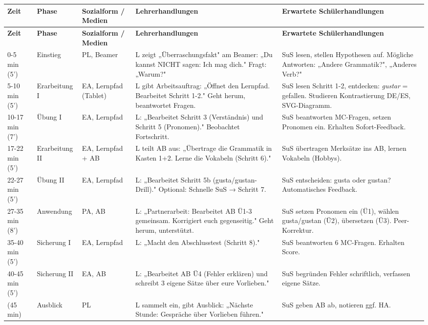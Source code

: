 \documentclass[11pt, a4paper]{article}
\newcommand{\es}[1]{\textcolor{spanisch}{\textit{#1}}}
\begin{document}
\small
\begin{longtable}{|p{1.2cm}|p{2cm}|p{2.5cm}|p{4.5cm}|p{4cm}|}
    \hline
    \textbf{Zeit} & \textbf{Phase} & \textbf{Sozialform / Medien} & \textbf{Lehrerhandlungen} & \textbf{Erwartete Schülerhandlungen} \\
    \hline
    \endfirsthead
    \hline
    \textbf{Zeit} & \textbf{Phase} & \textbf{Sozialform / Medien} & \textbf{Lehrerhandlungen} & \textbf{Erwartete Schülerhandlungen} \\
    \hline
    \endhead

    0-5 min (5') & Einstieg & PL, Beamer & L zeigt „Überraschungsfakt" am Beamer: „Du kannst NICHT sagen: Ich mag dich." Fragt: „Warum?" & SuS lesen, stellen Hypothesen auf. Mögliche Antworten: „Andere Grammatik?", „Anderes Verb?" \\
    \hline

    5-10 min (5') & Erarbeitung I & EA, Lernpfad (Tablet) & L gibt Arbeitsauftrag: „Öffnet den Lernpfad. Bearbeitet Schritt 1-2." Geht herum, beantwortet Fragen. & SuS lesen Schritt 1-2, entdecken: \es{gustar} = gefallen. Studieren Kontrastierung DE/ES, SVG-Diagramm. \\
    \hline

    10-17 min (7') & Übung I & EA, Lernpfad & L: „Bearbeitet Schritt 3 (Verständnis) und Schritt 5 (Pronomen)." Beobachtet Fortschritt. & SuS beantworten MC-Fragen, setzen Pronomen ein. Erhalten Sofort-Feedback. \\
    \hline

    17-22 min (5') & Erarbeitung II & EA, Lernpfad + AB & L teilt AB aus: „Übertrage die Grammatik in Kasten 1+2. Lerne die Vokabeln (Schritt 6)." & SuS übertragen Merksätze ins AB, lernen Vokabeln (Hobbys). \\
    \hline

    22-27 min (5') & Übung II & EA, Lernpfad & L: „Bearbeitet Schritt 5b (gusta/gustan-Drill)." Optional: Schnelle SuS → Schritt 7. & SuS entscheiden: gusta oder gustan? Automatisches Feedback. \\
    \hline

    27-35 min (8') & Anwendung & PA, AB & L: „Partnerarbeit: Bearbeitet AB Ü1-3 gemeinsam. Korrigiert euch gegenseitig." Geht herum, unterstützt. & SuS setzen Pronomen ein (Ü1), wählen gusta/gustan (Ü2), übersetzen (Ü3). Peer-Korrektur. \\
    \hline

    35-40 min (5') & Sicherung I & EA, Lernpfad & L: „Macht den Abschlusstest (Schritt 8)." & SuS beantworten 6 MC-Fragen. Erhalten Score. \\
    \hline

    40-45 min (5') & Sicherung II & EA, AB & L: „Bearbeitet AB Ü4 (Fehler erklären) und schreibt 3 eigene Sätze über eure Vorlieben." & SuS begründen Fehler schriftlich, verfassen eigene Sätze. \\
    \hline

    (45 min) & Ausblick & PL & L sammelt ein, gibt Ausblick: „Nächste Stunde: Gespräche über Vorlieben führen." & SuS geben AB ab, notieren ggf. HA. \\
    \hline
\end{longtable}
\normalsize
\end{document}
